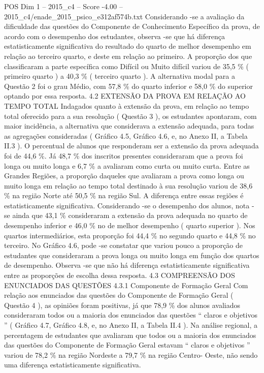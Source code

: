 \begin{textsample}{POS Dim 1 – 2015\_c4 – Score -4.00 – 2015\_c4/enade\_2015\_psico\_e312af574b.txt}
Considerando -se a avaliação da dificuldade das questões do Componente de Conhecimento Específico da prova, de acordo com o desempenho dos estudantes, observa -se que há diferença estatisticamente significativa do resultado do quarto de melhor desempenho em relação ao terceiro quarto, e deste em relação ao primeiro.
A proporção dos que classificaram a parte específica como Difícil ou Muito difícil variou de 35,5 \% ( primeiro quarto ) a 40,3 \% ( terceiro quarto ).
A alternativa modal para a Questão 2 foi o grau Médio, com 57,8 \% do quarto inferior e 58,0 \% do superior optando por essa resposta. 4.2 EXTENSÃO DA PROVA EM RELAÇÃO AO TEMPO TOTAL Indagados quanto à extensão da prova, em relação ao tempo total oferecido para a sua resolução ( Questão 3 ), os estudantes apontaram, com maior incidência, a alternativa que considerava a extensão adequada, para todas as agregações consideradas ( Gráfico 4.5, Gráfico 4.6, e, no Anexo II, a Tabela II.3 ).
O percentual de alunos que responderam ser a extensão da prova adequada foi de 44,6 \%.
Já 48,7 \% dos inscritos presentes consideraram que a prova foi longa ou muito longa e 6,7 \% a avaliaram como curta ou muito curta.
Entre as Grandes Regiões, a proporção daqueles que avaliaram a prova como longa ou muito longa em relação ao tempo total destinado à sua resolução variou de 38,6 \% na região Norte até 50,5 \% na região Sul.
A diferença entre essas regiões é estatisticamente significativa.
Considerando -se o desempenho dos alunos, nota -se ainda que 43,1 \% consideraram a extensão da prova adequada no quarto de desempenho inferior e 46,0 \% no de melhor desempenho ( quarto superior ).
Nos quartos intermediários, esta proporção foi 44,4 \% no segundo quarto e 44,8 \% no terceiro.
No Gráfico 4.6, pode -se constatar que variou pouco a proporção de estudantes que consideraram a prova longa ou muito longa em função dos quartos de desempenho.
Observa -se que não há diferença estatisticamente significativa entre as proporções de escolha dessa resposta. 4.3 COMPREENSÃO DOS ENUNCIADOS DAS QUESTÕES 4.3.1 Componente de Formação Geral Com relação aos enunciados das questões do Componente de Formação Geral ( Questão 4 ), as opiniões foram positivas, já que 78,9 \% dos alunos avaliados consideraram todos ou a maioria dos enunciados das questões “ claros e objetivos ” ( Gráfico 4.7, Gráfico 4.8, e, no Anexo II, a Tabela II.4 ).
Na análise regional, a percentagem de estudantes que avaliaram que todos ou a maioria dos enunciados das questões do Componente de Formação Geral estavam “ claros e objetivos ” variou de 78,2 \% na região Nordeste a 79,7 \% na região Centro- Oeste, não sendo uma diferença estatisticamente significativa.

\end{textsample}

